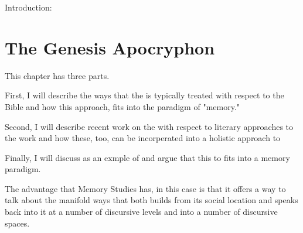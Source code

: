 Introduction:


\section{The Genesis Apocryphon}



This chapter has three parts. 

First, I will describe the ways that the \ga is typically treated with respect to the Bible and how this approach, fits into the paradigm of "memory."

Second, I will describe recent work on the \ga with respect to literary approaches to the work and how these, too, can be incorperated into a holistic approach to \ga

Finally, I will discuss \ga as an exmple of \psy and argue that this to fits into a memory paradigm.

The advantage that Memory Studies has, in this case is that it offers a way to talk about the manifold ways that \ga both builds from its social location and speaks back into it at a number of discursive levels and into a number of discursive spaces.